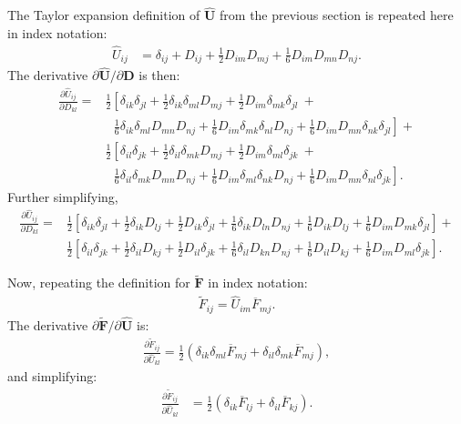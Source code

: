 The Taylor expansion definition of $\hat{\bm U}$ from the previous section is repeated here in index notation:
\begin{align}
\hat{U}_{ij} &= \delta_{ij} + D_{ij} + \frac{1}{2}D_{im}D_{mj} + \frac{1}{6}D_{im}D_{mn}D_{nj}.
\end{align}
The derivative $\partial \hat{\bm U}/{\partial {\bm D}}$ is then:
\begin{equation}
\begin{split}
\frac{\partial \hat{U}_{ij}}{\partial D_{kl}} = &\frac{1}{2}\left[\delta_{ik}\delta_{jl} + \frac{1}{2}\delta_{ik}\delta_{ml}D_{mj} + \frac{1}{2}D_{im}\delta_{mk}\delta_{jl}\  + \right.\\
&\ \left.\ \ \frac{1}{6}\delta_{ik}\delta_{ml}D_{mn}D_{nj} + \frac{1}{6}D_{im}\delta_{mk}\delta_{nl}D_{nj} + \frac{1}{6}D_{im}D_{mn}\delta_{nk}\delta_{jl}\right] + \\
&\frac{1}{2}\left[\delta_{il}\delta_{jk} + \frac{1}{2}\delta_{il}\delta_{mk}D_{mj} + \frac{1}{2}D_{im}\delta_{ml}\delta_{jk}\  + \right.\\
&\ \left.\ \ \frac{1}{6}\delta_{il}\delta_{mk}D_{mn}D_{nj} + \frac{1}{6}D_{im}\delta_{ml}\delta_{nk}D_{nj} + \frac{1}{6}D_{im}D_{mn}\delta_{nl}\delta_{jk}\right].
\end{split}
\end{equation}
Further simplifying,
\begin{align}
\frac{\partial \hat{U}_{ij}}{\partial D_{kl}} = &\frac{1}{2}\left[\delta_{ik}\delta_{jl} + \frac{1}{2}\delta_{ik}D_{lj} + \frac{1}{2}D_{ik}\delta_{jl} + \frac{1}{6}\delta_{ik}D_{ln}D_{nj} + \frac{1}{6}D_{ik}D_{lj} + \frac{1}{6}D_{im}D_{mk}\delta_{jl}\right] + \\
&\frac{1}{2}\left[\delta_{il}\delta_{jk} + \frac{1}{2}\delta_{il}D_{kj} + \frac{1}{2}D_{il}\delta_{jk} + \frac{1}{6}\delta_{il}D_{kn}D_{nj} + \frac{1}{6}D_{il}D_{kj} + \frac{1}{6}D_{im}D_{ml}\delta_{jk}\right].
\end{align}

Now, repeating the definition for $\tilde {\bm F}$ in index notation:
\begin{align}
\tilde{F}_{ij} = \hat{U}_{im}\overline{F}_{mj}.
\end{align}
The derivative ${\partial \tilde{\bm F}}/{\partial \hat{\bm U}}$ is:
\begin{align}
\frac{\partial \tilde{F}_{ij}}{\partial \hat{U}_{kl}} = \frac{1}{2}\left(\delta_{ik}\delta_{ml}\overline{F}_{mj} + \delta_{il}\delta_{mk}\overline{F}_{mj}\right),
\end{align}
and simplifying:
\begin{align}
\frac{\partial \tilde{F}_{ij}}{\partial \hat{U}_{kl}} &= \frac{1}{2}\left(\delta_{ik}\overline{F}_{lj} + \delta_{il}\overline{F}_{kj}\right).
\end{align}

